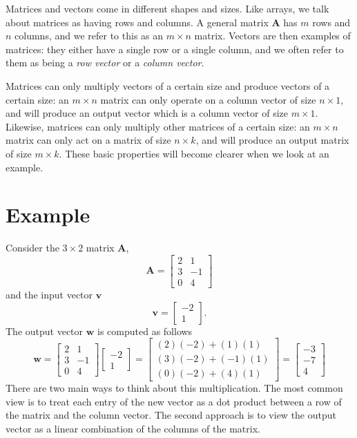 \documentclass{tufte-handout}
\begin{document}
Matrices and vectors come in different shapes and sizes. Like arrays, we talk about matrices as having rows and columns. A general matrix $\mathbf{A}$ has $m$ rows and $n$ columns, and we refer to this as an $m \times n$ matrix. Vectors are then examples of matrices: they either have a single row or a single column, and we often refer to them as being a {\it row vector} or a {\it column vector}.

Matrices can only multiply vectors of a certain size and produce vectors of a certain size: an $m \times n$ matrix can only operate on a column vector of size $ n \times 1$, and will produce an output vector which is a column vector of size $ m \times 1$. Likewise, matrices can only multiply other matrices of a certain size: an $m \times n$ matrix can only act on a matrix of size $ n \times k$, and will produce an output matrix of size $ m \times k$. These basic properties will become clearer when we look at an example.

\section{Example}
Consider the $3 \times 2$ matrix $\mathbf{A}$,
\[ \mathbf{A} =
\left[\begin{array}{rr}
2 & 1 \\
3 & -1 \\
0 & 4
\end{array}\right]
\]
and the input vector $\mathbf{v}$
\[ \mathbf{v} =
\left[\begin{array}{rr}
-2 \\
1
\end{array}\right].
\]
The output vector $\mathbf{w}$ is computed as follows
\[ \mathbf{w} =
\left[\begin{array}{rr}
2 & 1 \\
3 & -1 \\
0 & 4
\end{array}\right]
\left[\begin{array}{rr}
-2  \\
1
\end{array}\right]
=
\left[
\begin{array}{cc}
(2)(-2) + (1)(1) \\
(3)(-2) + (-1)(1) \\
(0)(-2) + (4)(1)
\end{array}
\right]
=
\left[
\begin{array}{rr}
-3 \\
-7 \\
4
\end{array}
\right]
\]
There are two main ways to think about this multiplication. The most common view is to treat each entry of the new vector as a dot product between a row of the matrix and the column vector. The second approach is to view the output vector as a linear combination of the columns of the matrix.
\end{document}
